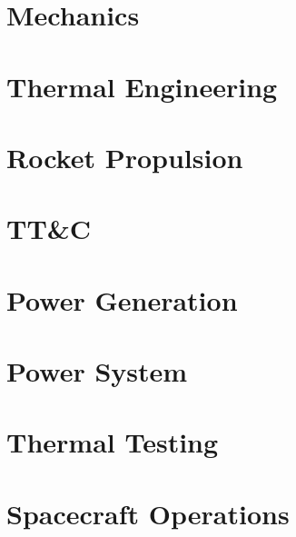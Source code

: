 \documentclass[a4paper,10pt]{article}
\begin{document}
\section{}

\section{Mechanics}

\section{Thermal Engineering}

\section{Rocket Propulsion}

\section{TT\&C}

\section{Power Generation}

\section{Power System}

\section{Thermal Testing}

\section{Spacecraft Operations}
\end{document}
